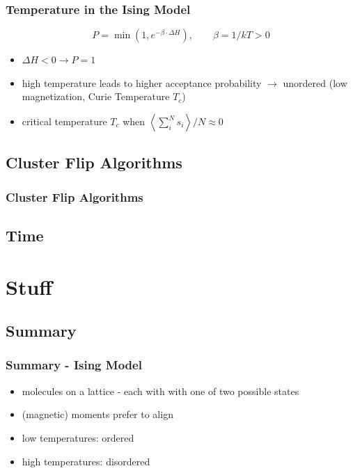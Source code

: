 \documentclass{beamer}
\begin{document}
\begin{frame}\frametitle{Temperature in the Ising Model}
\begin{equation*}
P = \operatorname{min}\left(1,e^{-\beta\cdot \Delta H}\right),\qquad \beta = 1/kT > 0
\end{equation*}
\begin{itemize}
\item $\Delta H < 0 \rightarrow P = 1$
\item high temperature leads to higher acceptance probability
$\rightarrow$ unordered (low magnetization, Curie Temperature $T_c$)
\item critical temperature $T_c$ when $\left<\sum_i^N s_i\right>/N \approx 0$
\end{itemize}
\end{frame}




\subsection{Cluster Flip Algorithms}
\begin{frame}\frametitle{Cluster Flip Algorithms}

\end{frame}
\subsection{Time}






\section{Stuff}
\subsection{Summary}
\begin{frame}\frametitle{Summary - Ising Model}
\begin{itemize}
\item molecules on a lattice - each with with one of two possible states
\item (magnetic) moments prefer to align
\item low temperatures: ordered
\item high temperatures: disordered
\end{itemize}
\end{frame}
\end{document}
